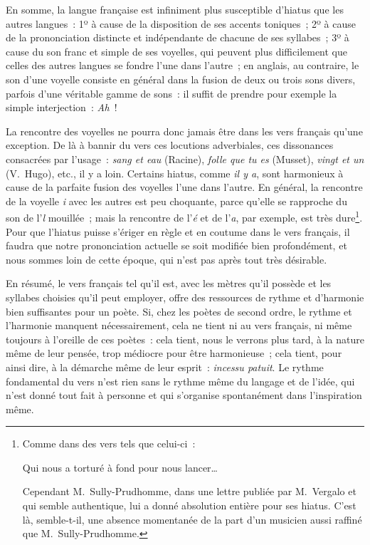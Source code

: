 \documentclass[french,twoside]{book} %
\newcommand\foreign[1]{\emph{#1}}
\newcommand{\bibl}[1]{{\RaggedLeft{#1}\par\bigskip}}
\begin{document}
En somme, la langue française est infiniment plus susceptible d’hiatus que les autres langues : 1º à cause de la disposition de ses accents toniques ; 2º à cause de la prononciation distincte et indépendante de chacune de ses syllabes ; 3º à cause du son franc et simple de ses voyelles, qui peuvent plus difficilement que celles des autres langues  se fondre l’une dans l’autre ; en anglais, au contraire, le son d’une voyelle consiste en général dans la fusion de deux ou trois sons divers, parfois d’une véritable gamme de sons : il suffit de prendre pour exemple la simple interjection : \emph{Ah} !\par
La rencontre des voyelles ne pourra donc jamais être dans les vers français qu’une exception. De là à bannir du vers ces locutions adverbiales, ces dissonances consacrées par l’usage : \emph{sang et eau} (Racine), \emph{folle que tu es} (Musset), \emph{vingt et un} (V. Hugo), etc., il y a loin. Certains hiatus, comme \emph{il y a}, sont harmonieux à cause de la parfaite fusion des voyelles l’une dans l’autre. En général, la rencontre de la voyelle \emph{i} avec les autres est peu choquante, parce qu’elle se rapproche du son de l’\emph{l} mouillée ; mais la rencontre de l’\emph{é} et de l’\emph{a}, par exemple, est très dure\footnote{\noindent Comme dans des vers tels que celui-ci :\par
Qui nous a torturé à fond pour nous lancer…\\

\bibl{({\scshape Vergalo}, \emph{Le livre des Incas}.)}
\par
\noindent Cependant M. Sully-Prudhomme, dans une lettre publiée par M. Vergalo et qui semble authentique, lui a donné absolution entière pour ses hiatus. C’est là, semble-t-il, une absence momentanée de la part d’un musicien aussi raffiné que M. Sully-Prudhomme.
}. Pour que l’hiatus puisse s’ériger en règle et en coutume dans le vers français, il faudra que notre prononciation actuelle se soit modifiée bien profondément, et nous sommes loin de cette époque, qui n’est pas après tout très désirable.\par
 En résumé, le vers français tel qu’il est, avec les mètres qu’il possède et les syllabes choisies qu’il peut employer, offre des ressources de rythme et d’harmonie bien suffisantes pour un poète. Si, chez les poètes de second ordre, le rythme et l’harmonie manquent nécessairement, cela ne tient ni au vers français, ni même toujours à l’oreille de ces poètes : cela tient, nous le verrons plus tard, à la nature même de leur pensée, trop médiocre pour être harmonieuse ; cela tient, pour ainsi dire, à la démarche même de leur esprit : \foreign{\emph{incessu patuit}}. Le rythme fondamental du vers n’est rien sans le rythme même du langage et de l’idée, qui n’est donné tout fait à personne et qui s’organise spontanément dans l’inspiration même.
\end{document}
